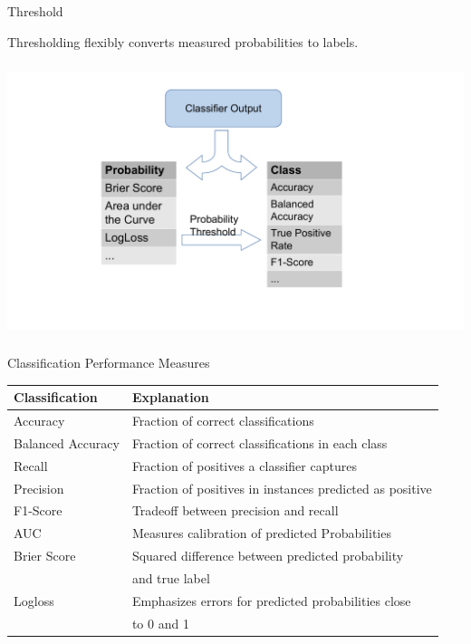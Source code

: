 \begin{frame}{Threshold}

Thresholding flexibly converts measured probabilities to labels.

\begin{centering}
\includegraphics[height=8cm, width=14cm,page=2]{plots/confusion_matrix_measures.pdf}
\end{centering}

\end{frame}

\begin{frame}{Classification Performance Measures}

\small

\begin{table}[]
\begin{tabular}{ll}
\hline
\textbf{Classification}& \textbf{Explanation}  \\ \hline
Accuracy              &  Fraction of correct classifications                             \\ \hline
Balanced Accuracy     &  Fraction of correct classifications in each class               \\ \hline
Recall                &  Fraction of positives a classifier captures                     \\ \hline
Precision             &  Fraction of positives in instances predicted as positive        \\ \hline 
F1-Score              &  Tradeoff between precision and recall                           \\ \hline
AUC                   &  Measures calibration of predicted Probabilities                 \\ \hline
Brier Score           &  Squared difference between predicted probability                \\ 
                      & and true label                                                   \\ \hline
Logloss               &  Emphasizes errors for predicted probabilities close             \\ 
                      & to 0 and 1                                                       \\ \hline
\end{tabular}
\end{table}

\normalsize

\end{frame}

